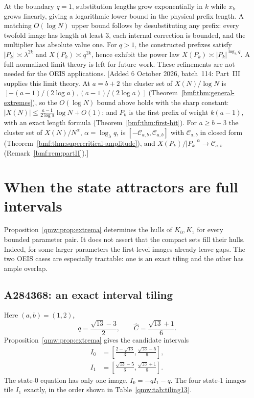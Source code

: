 \documentclass[11pt]{article}
\numberwithin{equation}{section}
\theoremstyle{definition}
\theoremstyle{remark}
\newcommand{\abs}[1]{\lvert#1\rvert}
\begin{document}
At the boundary $q=1$, substitution lengths grow exponentially in $k$ while
$x_k$ grows linearly, giving a logarithmic lower bound in the physical prefix
length.  A matching $O(\log N)$ upper bound follows by desubstituting any
prefix: every twofold image has length at least $3$, each internal correction
is bounded, and the multiplier has absolute value one.  For $q>1$, the
constructed prefixes satisfy $\abs{P_k}\asymp\lambda^{2k}$ and
$X(P_k)\asymp q^{2k}$, hence exhibit the power law
$X(P_k)\asymp\abs{P_k}^{\log_\lambda q}$.  A full normalized limit theory is
left for future work.  These refinements are not needed for the OEIS
applications.
[Added 6 October 2026, batch~114: Part~III supplies this limit theory. At
$a=b+2$ the cluster set of $X(N)/\log N$ is
$[-(a-1)/(2\log a),(a-1)/(2\log a)]$
(Theorem~\ref{bmf:thm:general-extremes}), so the $O(\log N)$ bound above
holds with the sharp constant: $\abs{X(N)}\leq\frac{a-1}{2\log a}\log N+O(1)$;
and $P_k$ is the first prefix of weight $k(a-1)$, with an exact length
formula (Theorem~\ref{bmf:thm:first-hit}). For $a\geq b+3$ the cluster set
of $X(N)/N^{\alpha}$, $\alpha=\log_\lambda q$, is
$[-\mathcal C_{a,b},\mathcal C_{a,b}]$ with $\mathcal C_{a,b}$ in closed
form (Theorem~\ref{bmf:thm:supercritical-amplitude}), and
$X(P_k)/\abs{P_k}^\alpha\to\mathcal C_{a,b}$
(Remark~\ref{bmf:rem:partII}).]

\section{When the state attractors are full intervals}\label{qmw:sec:intervals}

Proposition~\ref{qmw:prop:extrema} determines the hulls of $K_0,K_1$ for every
bounded parameter pair.  It does not assert that the compact sets fill their
hulls.  Indeed, for some larger parameters the first-level images already
leave gaps.  The two OEIS cases are especially tractable: one is an exact
tiling and the other has ample overlap.

\subsection{A284368: an exact interval tiling}

Here $(a,b)=(1,2)$,
\begin{equation}\label{qmw:eq:q13C13}
q=\frac{\sqrt{13}-3}{2},
\qquad
{\widehat C}=\frac{\sqrt{13}+1}{6}.
\end{equation}
Proposition~\ref{qmw:prop:extrema} gives the candidate intervals
\begin{align}
I_0&=\left[\frac{2-\sqrt{13}}3,\frac{\sqrt{13}-5}{6}\right],
\label{qmw:eq:I0-13}\\
I_1&=\left[\frac{\sqrt{13}-5}{6},\frac{\sqrt{13}+1}{6}\right].
\label{qmw:eq:I1-13}
\end{align}
The state-$0$ equation has only one image, $I_0=-qI_1-q$.  The four
state-$1$ images tile $I_1$ exactly, in the order shown in
Table~\ref{qmw:tab:tiling13}.
\end{document}
